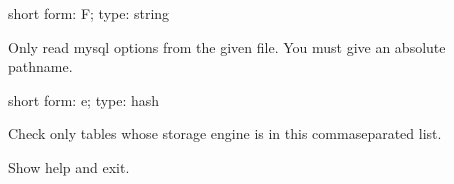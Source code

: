\documentclass[letterpaper,10pt,english]{sphinxmanual}
\begin{document}
\begin{fulllineitems}
\label{\detokenize{mariadb-index-checker:cmdoption-mariadb-index-checker-defaults-file}}
short form: \sphinxhyphen{}F; type: string

Only read mysql options from the given file.  You must give an absolute pathname.

\end{fulllineitems}


\begin{fulllineitems}
\label{\detokenize{mariadb-index-checker:cmdoption-mariadb-index-checker-engines}}
short form: \sphinxhyphen{}e; type: hash

Check only tables whose storage engine is in this comma\sphinxhyphen{}separated list.

\end{fulllineitems}


\begin{fulllineitems}
\label{\detokenize{mariadb-index-checker:cmdoption-mariadb-index-checker-help}}
Show help and exit.

\end{fulllineitems}
\end{document}
